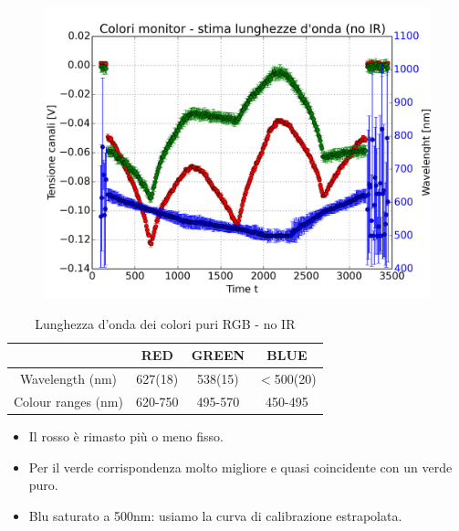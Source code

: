 \documentclass{beamer}
\begin{document}
\begin{frame}
\begin{figure}
\centering
\includegraphics[width=0.6\linewidth]{./monitor_stima_lunghezzaonda_senzaIR}
\label{fig:monitor_stima_lunghezzaonda_senzaIR}
\end{figure}

\begin{table}[h]
\centering
\begin{tabular}{c|c|c|c}
  & \textbf{RED} & \textbf{GREEN} & \textbf{BLUE} \\ 
 \hline Wavelength (nm) & 627(18) & 538(15) & $<$500(20) \\
 Colour ranges (nm) & 620-750 & 495-570 & 450-495 \\ 
\hline 
\end{tabular} 
\caption{Lunghezza d'onda dei colori puri RGB - no IR}
\label{RGB_lambda_noIR}
\end{table}
\end{frame}

\begin{frame}
\begin{itemize}
\item Il rosso è rimasto più o meno fisso.
\item Per il verde corrispondenza molto migliore e quasi coincidente con un verde puro.  
\item Blu saturato a 500nm: usiamo la curva di calibrazione estrapolata.
\end{itemize}
\end{frame}
\end{document}
